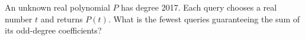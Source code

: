 An unknown real polynomial $ P $ has degree 2017. Each query chooses a real number $ t $ and returns $ P(t)$. What is the fewest queries guaranteeing the sum of its odd-degree coefficients?
